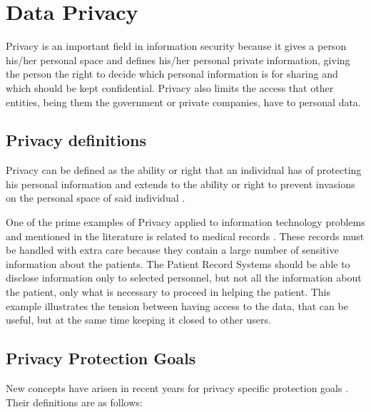 \section{Data Privacy} 
\label{sec:DataPrivacy}

Privacy is an important field in information security because it gives a person his/her personal space and defines his/her personal private information, giving the person the right to decide which personal information is for sharing and which should be kept confidential. Privacy also limits the access that other entities, being them the government or private companies, have to personal data.


\subsection{Privacy definitions}
\label{ssec:PrivacyDefinitions}


Privacy can be defined as the ability or right that an individual has of protecting his personal information and extends to the ability or right to prevent invasions on the personal space of said individual \cite{anderson2008security}.

One of the prime examples of Privacy applied to information technology problems and mentioned in the literature is related to medical records \cite{Lu2014}. These records must be handled with extra care because they contain a large number of sensitive information about the patients. The Patient Record Systems should be able to disclose information only to selected personnel, but not all the information about the patient, only what is necessary to proceed in helping the patient. This example illustrates the tension between having access to the data, that can be useful, but at the same time keeping it closed to other users.



\subsection{Privacy Protection Goals}
\label{ssec:PrivacyProtectionGoals}

New concepts have arisen in recent years for privacy specific protection goals \cite{Danezis2015}. Their definitions are as follows:

